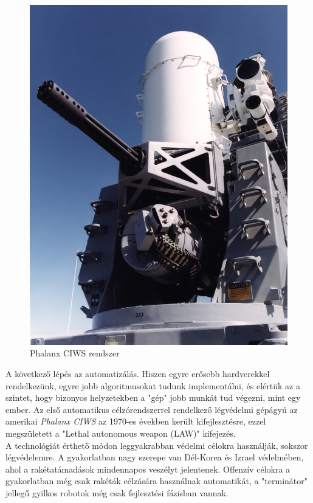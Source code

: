 \documentclass[12pt,a4paper]{article}
\begin{document}
\begin{figure}
	\centering
	\includegraphics[width=0.95\linewidth]{irod_phalanx} 
	\caption{Phalanx CIWS rendszer}
	\label{fig:irod_phalanx}
\end{figure}

A következő lépés az automatizálás. Hiszen egyre erősebb hardverekkel rendelkezünk, egyre jobb algoritmusokat tudunk implementálni, és elértük az a szintet, hogy bizonyos helyzetekben a "gép" jobb munkát tud végezni, mint egy ember. Az első automatikus célzórendszerrel rendelkező légvédelmi gépágyú az amerikai \textsl{Phalanx CIWS} az 1970-es években került kifejlesztésre, ezzel megszületett a "Lethal autonomous weapon (LAW)" kifejezés.\\

A technológiát érthető módon leggyakrabban védelmi célokra használják, sokszor légvédelemre. A gyakorlatban nagy szerepe van Dél-Korea és Izrael védelmében, ahol a rakétatámadások mindennapos veszélyt jelentenek. Offenzív célokra a gyakorlatban még csak rakéták célzására használnak automatikát, a "terminátor" jellegű gyilkos robotok még csak fejlesztési fázisban vannak.
\end{document}
